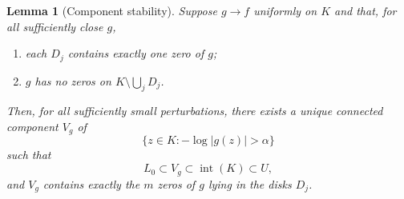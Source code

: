 \documentclass[12pt]{amsart}
\theoremstyle{definition}
\newtheorem{lemma}[theorem]{Lemma}
\theoremstyle{remark}
\begin{document}
\medskip
\begin{lemma}[Component stability]\label{lem:component-stability}
\emph{Suppose $g\to f$ uniformly on $K$ and that, for all sufficiently
close $g$,}
\begin{enumerate}
\item[(a)] \emph{each $D_j$ contains exactly one zero of $g$;}
\item[(b)] \emph{$g$ has no zeros on $K\setminus \bigcup_j D_j$.}
\end{enumerate}
\emph{Then, for all sufficiently small perturbations, there exists a unique connected component $V_g$ of
\[
\{z\in K:-\log|g(z)|>\alpha\}
\]
such that
\[
L_0\subset V_g\subset \operatorname{int}(K)\subset U,
\]
and $V_g$ contains exactly the $m$ zeros of $g$ lying in the disks $D_j$.}
\end{lemma}
\end{document}
